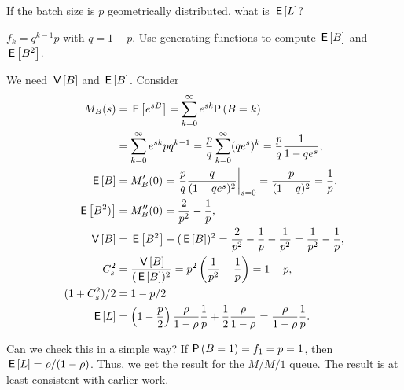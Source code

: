 \begin{exercise}
  If the batch size is $p$ geometrically distributed, what is $\,\mathsf{E}\left[L\right]$?
  \begin{hint}
$f_k=q^{k-1}p$ with $q=1-p$. Use generating functions to compute $\,\mathsf{E}\left[B\right]$ and $\,\mathsf{E}\left[B^2\right]$.
  \end{hint}
\begin{solution}
  We need $\,\mathsf{V}\left[B\right]$ and $\,\mathsf{E}\left[B\right]$. Consider
  \begin{align*}
    M_B(s) 
&= \E{e^{sB}} = \sum_{k=0}^\infty e^{sk} \P{B=k} \\
&= \sum_{k=0}^\infty e^{sk} p q^{k-1} 
= \frac p q \sum_{k=0}^\infty (q e^s)^k = \frac p q \frac1{1-qe^s},\\
  \E B &= M_B'(0) = \left.\frac p q \frac q{(1-q e^s)^2}\right|_{s=0}= \frac p{(1-q)^2} = \frac 1 p,\\
  \E{B^2)} &= M_B''(0) = \frac2{p^2} - \frac1p, \\
  \V B &= \E{B^2} - (\E B)^2 = \frac2{p^2} - \frac1p - \frac1{p^2} = \frac1{p^2}-\frac1p,\\
  C_s^2&= \frac{\V B}{(\E B)^2} = p^2 \left(\frac1{p^2}-\frac1p\right)=1-p,\\
  (1+C_s^2)/2 &= 1-p/2\\
  \E L &= 
\left(1-\frac p2\right) \frac\rho{1-\rho} \frac 1 p + \frac12\frac\rho{1-\rho}
=\frac\rho{1-\rho} \frac 1 p.
\end{align*}

Can we check this in a simple way? If $\P{B=1}=f_1 = p =1$, then
$\,\mathsf{E}\left[L\right]=\rho/(1-\rho)$. Thus, we get the result for the $M/M/1$
queue. The result is at least consistent with earlier work.
\end{solution}
\end{exercise}

